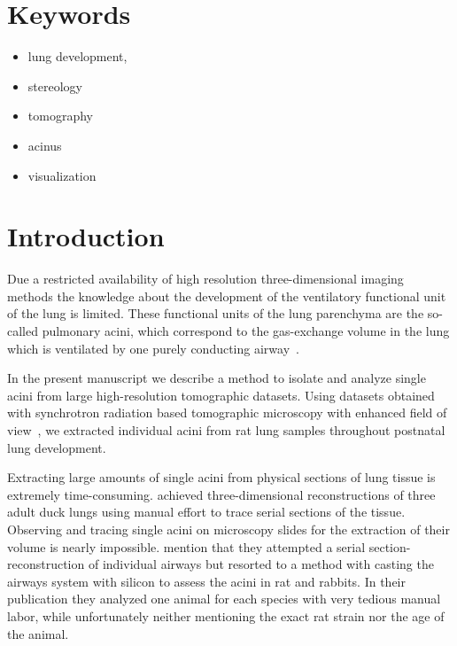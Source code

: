 \documentclass[twoside,paper=a4,abstract=true,english,DIV=calc]{scrartcl}
\begin{document}
\section{Keywords}
\begin{itemize}
	\item lung development,
	\item stereology
	\item tomography
	\item acinus
	\item visualization
\end{itemize}
\clearpage
\listoftodos
\clearpage
\tableofcontents

\clearpage
\section{Introduction}
Due a restricted availability of high resolution three-dimensional imaging methods the knowledge about the development of the ventilatory functional unit of the lung is limited. These functional units of the lung parenchyma are the so-called pulmonary acini, which correspond to the gas-exchange volume in the lung which is ventilated by one purely conducting airway~\cite{Rodriguez1987}.

In the present manuscript we describe a method to isolate and analyze single acini from large high-resolution tomographic datasets. Using datasets obtained with synchrotron radiation based tomographic microscopy with enhanced field of view~\cite{Haberthuer2010a}, we extracted individual acini from rat lung samples throughout postnatal lung development. 

Extracting large amounts of single acini from physical sections of lung tissue is extremely time-consuming. \citet{Woodward2005} achieved three-dimensional reconstructions of three adult duck lungs using manual effort to trace serial sections of the tissue. Observing and tracing single acini on microscopy slides for the extraction of their volume is nearly impossible. \citet{Rodriguez1987} mention that they attempted a serial section-reconstruction of individual airways but resorted to a method with casting the airways system with silicon to assess the acini in rat and rabbits. In their publication they analyzed one animal for each species with very tedious manual labor, while unfortunately neither mentioning the exact rat strain nor the age of the animal.
\end{document}
